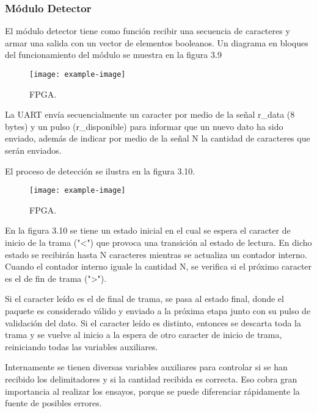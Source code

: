 \subsubsection{Módulo Detector}

\lipsum[1]

El módulo detector tiene como función recibir una secuencia de caracteres y armar una salida con un vector de elementos booleanos. Un diagrama en bloques del funcionamiento del módulo se muestra en la figura 3.9

\begin{figure}[H]
	\centering
	\texttt{[image: example-image]}
	\centering\caption{FPGA.}
	\label{fig:XXX}
\end{figure}

La UART envía secuencialmente un caracter por medio de la señal r\_data (8 bytes) y un pulso (r\_disponible) para informar que un nuevo dato ha sido enviado, además de indicar por medio de la señal N la cantidad de caracteres que serán
enviados.

El proceso de detección se ilustra en la figura 3.10.

\begin{figure}[H]
	\centering
	\texttt{[image: example-image]}
	\centering\caption{FPGA.}
	\label{fig:XXX}
\end{figure}

En la figura 3.10 se tiene un estado inicial en el cual se espera el caracter de inicio de la trama ("<") que provoca una transición al estado de lectura. En dicho estado se recibirán hasta N caracteres mientras se actualiza un contador interno. Cuando el contador interno iguale la cantidad N, se verifica si el próximo caracter es el de
fin de trama (">"). 

Si el caracter leído es el de final de trama, se pasa al estado final, donde el paquete es considerado válido y enviado a la próxima etapa junto con su pulso de validación del dato. Si el caracter leído es distinto, entonces se descarta toda la trama y se vuelve al inicio a la espera de otro caracter de inicio de trama, reiniciando
todas las variables auxiliares.

Internamente se tienen diversas variables auxiliares para controlar si se han recibido los delimitadores y si la cantidad recibida es correcta. Eso cobra gran importancia al realizar los ensayos, porque se puede diferenciar rápidamente la fuente de posibles errores.